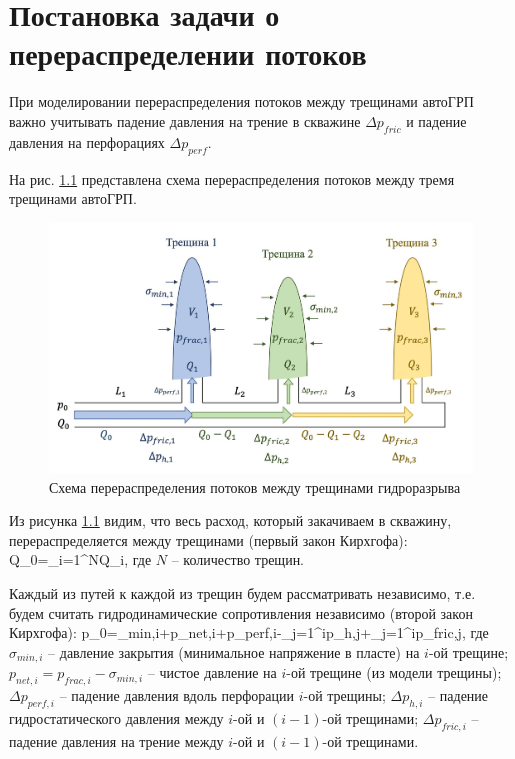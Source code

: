 \chapter{Постановка задачи о перераспределении потоков} \label{ch1}

При моделировании перераспределения потоков между трещинами автоГРП важно учитывать падение давления на трение в скважине $\Delta p_{fric}$ и падение давления на перфорациях $\Delta p_{perf}$.

На рис. \ref{fig:flow_distribution_scheme} представлена схема перераспределения потоков между тремя трещинами автоГРП.

\begin{figure}[H] 
\center
\includegraphics[width=0.9\linewidth]{images/flow_distribution_scheme.jpg}
\caption{Схема перераспределения потоков между трещинами гидроразрыва} 
\label{fig:flow_distribution_scheme}  
\end{figure}

Из рисунка \ref{fig:flow_distribution_scheme} видим, что весь расход, который закачиваем в скважину, перераспределяется между трещинами (первый закон Кирхгофа):
\beq\label{1_1}
Q_0=\sum\limits_{i=1}^{N}Q_i,
\eeq
где $N$ -- количество трещин.

Каждый из путей к каждой из трещин будем рассматривать независимо, т.е. будем считать гидродинамические сопротивления независимо (второй закон Кирхгофа):
\beq\label{1_2}
p_0=\sigma_{min,i}+p_{net,i}+\Delta p_{perf,i}-\sum_{j=1}^{i}{\Delta p_{h,j}}+\sum_{j=1}^{i}\Delta p_{fric,j},
\eeq
где $\sigma_{min,i}$ -- давление закрытия (минимальное напряжение в пласте) на $i$-ой трещине;\newline
$p_{net,i}=p_{frac,i}-\sigma_{min,i}$ -- чистое давление на $i$-ой трещине (из модели трещины);\newline
$\Delta p_{perf,i}$ -- падение давления вдоль перфорации $i$-ой трещины;\newline
$\Delta p_{h,i}$ -- падение гидростатического давления между $i$-ой и $(i-1)$-ой трещинами;\newline
$\Delta p_{fric,i}$ -- падение давления на трение между $i$-ой и $(i-1)$-ой трещинами.

